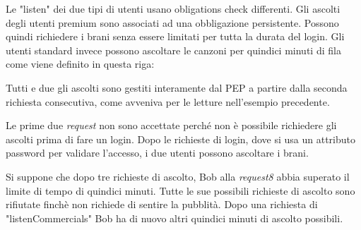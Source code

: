Le "listen" dei due tipi di utenti usano obligations check differenti. Gli ascolti degli utenti premium sono associati
ad una obbligazione persistente. Possono quindi richiedere i brani senza essere limitati per tutta la durata del login.
Gli utenti standard invece possono ascoltare le canzoni per quindici minuti di fila come viene definito in questa riga:

Tutti e due gli ascolti sono gestiti interamente dal \ac{PEP} a partire dalla seconda richiesta consecutiva, come avveniva per
le letture nell'esempio precedente.

Le prime due \emph{request} non sono accettate perché non è possibile richiedere gli ascolti prima di fare un login.
Dopo le richieste di login, dove si usa un attributo password per validare l'accesso, i due utenti possono ascoltare i brani.

Si suppone che dopo tre richieste di ascolto, Bob alla \emph{request8} abbia superato il limite di tempo di quindici minuti.
Tutte le sue possibili richieste di ascolto sono rifiutate finchè non richiede di sentire la pubblità. Dopo una richiesta
di "listenCommercials" Bob ha di nuovo altri quindici minuti di ascolto possibili.

